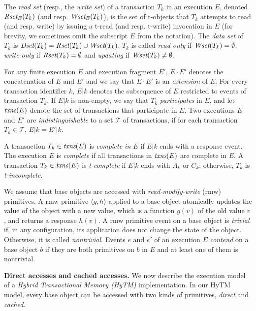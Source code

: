 The \emph{read set} (resp., the \emph{write set}) of a transaction $T_k$ in an execution $E$,
denoted $\textit{Rset}_E(T_k)$ (and resp. $\textit{Wset}_E(T_k)$), is the set of t-objects that $T_k$ attempts to read (and resp. write) 
by issuing a t-read (and resp. t-write) invocation in $E$ (for brevity, we sometimes 
omit the subscript $E$ from the notation).
The \emph{data set} of $T_k$ is $\textit{Dset}(T_k)=\textit{Rset}(T_k)\cup\textit{Wset}(T_k)$.
$T_k$ is called \emph{read-only} if $\textit{Wset}(T_k)=\emptyset$; \emph{write-only} if $\textit{Rset}(T_k)=\emptyset$ and
\emph{updating} if $\textit{Wset}(T_k)\neq\emptyset$.

For any finite execution $E$ and execution fragment $E'$, $E\cdot E'$ denotes the concatenation of $E$ and $E'$
and we say that $E\cdot E'$ is an \emph{extension}
of $E$.
For every transaction identifier $k$,
$E|k$ denotes the subsequence of $E$ restricted to events of
transaction $T_k$.
If $E|k$ is non-empty,
we say that $T_k$ \emph{participates} in $E$,
and let $\textit{txns}(E)$ denote the set of transactions that participate in $E$.
Two executions $E$ and $E'$
are \emph{indistinguishable} to a set $\mathcal{T}$ of transactions, if
for each transaction $T_k \in \mathcal{T}$, $E|k=E'|k$.

A transaction $T_k\in \textit{txns}(E)$ is \emph{complete in $E$} if
$E|k$ ends with a response event.
The execution $E$ is \emph{complete} if all transactions in $\textit{txns}(E)$
are complete in $E$.
A transaction $T_k\in \textit{txns}(E)$ is \emph{t-complete} if $E|k$
ends with $A_k$ or $C_k$; otherwise, $T_k$ is \emph{t-incomplete}.

We assume that base objects are accessed with \emph{read-modify-write} (rmw) primitives. 
A rmw primitive $\langle g,h \rangle$ applied to a base object 
atomically updates the value of the object with a new value, which is
a function $g(v)$ of the old value $v$, and returns a response $h(v)$.
A rmw primitive event on a base object is \emph{trivial} if, in any configuration, its application
does not change the state of the object. 
Otherwise, it is called \emph{nontrivial}.
Events $e$ and $e'$ of an execution $E$  \emph{contend} on a base
object $b$ if they are both primitives on $b$ in $E$ and at least 
one of them is nontrivial.

\vspace{1mm}\noindent\textbf{Direct accesses and cached accesses.}
We now describe the execution model of a \emph{Hybrid Transactional Memory (HyTM)} implementation.
In our HyTM model, every base object can be accessed with two kinds of
primitives, \emph{direct} and \emph{cached}.

